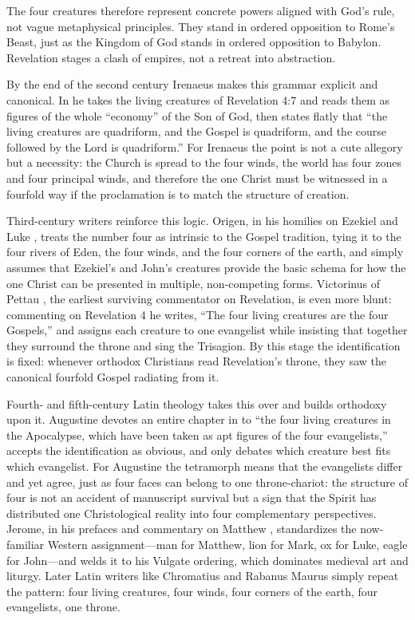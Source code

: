 The four creatures therefore represent concrete powers aligned with God's rule, not vague metaphysical principles.
They stand in ordered opposition to Rome's Beast, just as the Kingdom of God stands in ordered opposition to Babylon.
Revelation stages a clash of empires, not a retreat into abstraction.

By the end of the second century Irenaeus makes this grammar explicit and canonical.
In \cite[3.11.8]{irenaeus:advhaer} he takes the living creatures of Revelation 4:7 and reads them as figures of the whole ``economy'' of the Son of God, then states flatly that ``the living creatures are quadriform, and the Gospel is quadriform, and the course followed by the Lord is quadriform.''
For Irenaeus the point is not a cute allegory but a necessity: the Church is spread to the four winds, the world has four zones and four principal winds, and therefore the one Christ must be witnessed in a fourfold way if the proclamation is to match the structure of creation.

Third-century writers reinforce this logic.
Origen, in his homilies on Ezekiel \cite{origen:homezek} and Luke \cite{origen:homluke}, treats the number four as intrinsic to the Gospel tradition, tying it to the four rivers of Eden, the four winds, and the four corners of the earth, and simply assumes that Ezekiel's and John's creatures provide the basic schema for how the one Christ can be presented in multiple, non-competing forms.
Victorinus of Pettau \cite[Rev 4]{victorinus:apocalypse}, the earliest surviving commentator on Revelation, is even more blunt: commenting on Revelation 4 he writes, ``The four living creatures are the four Gospels,'' and assigns each creature to one evangelist while insisting that together they surround the throne and sing the Trisagion.
By this stage the identification is fixed: whenever orthodox Christians read Revelation's throne, they saw the canonical fourfold Gospel radiating from it.

Fourth- and fifth-century Latin theology takes this over and builds orthodoxy upon it.
Augustine devotes an entire chapter in \cite[1.6]{augustine:consensu} to ``the four living creatures in the Apocalypse, which have been taken as apt figures of the four evangelists,'' accepts the identification as obvious, and only debates which creature best fits which evangelist.
For Augustine the tetramorph means that the evangelists differ and yet agree, just as four faces can belong to one throne-chariot: the structure of four is not an accident of manuscript survival but a sign that the Spirit has distributed one Christological reality into four complementary perspectives.
Jerome, in his prefaces and commentary on Matthew \cite{jerome:matthew}, standardizes the now-familiar Western assignment---man for Matthew, lion for Mark, ox for Luke, eagle for John---and welds it to his Vulgate ordering, which dominates medieval art and liturgy.
Later Latin writers like Chromatius and Rabanus Maurus simply repeat the pattern: four living creatures, four winds, four corners of the earth, four evangelists, one throne.

